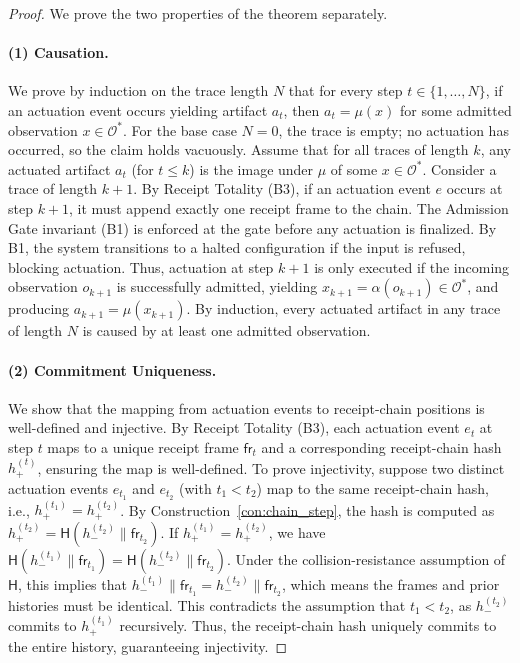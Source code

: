 \documentclass[11pt,oneside]{book}
\theoremstyle{definition}
\theoremstyle{plain}
\theoremstyle{remark}
\newcommand{\Obs}{\mathcal{O}}                 %
\newcommand{\muop}{\mu}                        %
\newcommand{\adm}{\alpha}                      %
\newcommand{\chainH}{\mathsf{H}}               %
\begin{document}
\begin{proof}
We prove the two properties of the theorem separately. %

\paragraph{(1) Causation.}
We prove by induction on the trace length $N$ that for every step $t \in \{1, \dots, N\}$, if an actuation event occurs yielding artifact $a_t$, then $a_t = \muop(x)$ for some admitted observation $x \in \Obs^*$. %
For the base case $N = 0$, the trace is empty; no actuation has occurred, so the claim holds vacuously. %
Assume that for all traces of length $k$, any actuated artifact $a_t$ (for $t \le k$) is the image under $\muop$ of some $x \in \Obs^*$. %
Consider a trace of length $k+1$. %
By Receipt Totality (B3), if an actuation event $e$ occurs at step $k+1$, it must append exactly one receipt frame to the chain. %
The Admission Gate invariant (B1) is enforced at the gate before any actuation is finalized. %
By B1, the system transitions to a halted configuration if the input is refused, blocking actuation. %
Thus, actuation at step $k+1$ is only executed if the incoming observation $o_{k+1}$ is successfully admitted, yielding $x_{k+1} = \adm(o_{k+1}) \in \Obs^*$, and producing $a_{k+1} = \muop(x_{k+1})$. %
By induction, every actuated artifact in any trace of length $N$ is caused by at least one admitted observation. %

\paragraph{(2) Commitment Uniqueness.}
We show that the mapping from actuation events to receipt-chain positions is well-defined and injective. %
By Receipt Totality (B3), each actuation event $e_t$ at step $t$ maps to a unique receipt frame $\mathsf{fr}_t$ and a corresponding receipt-chain hash $h_+^{(t)}$, ensuring the map is well-defined. %
To prove injectivity, suppose two distinct actuation events $e_{t_1}$ and $e_{t_2}$ (with $t_1 < t_2$) map to the same receipt-chain hash, i.e., $h_+^{(t_1)} = h_+^{(t_2)}$. %
By Construction~\ref{con:chain_step}, the hash is computed as $h_+^{(t_2)} = \chainH(h_-^{(t_2)} \parallel \mathsf{fr}_{t_2})$. %
If $h_+^{(t_1)} = h_+^{(t_2)}$, we have $\chainH(h_-^{(t_1)} \parallel \mathsf{fr}_{t_1}) = \chainH(h_-^{(t_2)} \parallel \mathsf{fr}_{t_2})$. %
Under the collision-resistance assumption of $\chainH$, this implies that $h_-^{(t_1)} \parallel \mathsf{fr}_{t_1} = h_-^{(t_2)} \parallel \mathsf{fr}_{t_2}$, which means the frames and prior histories must be identical. %
This contradicts the assumption that $t_1 < t_2$, as $h_-^{(t_2)}$ commits to $h_+^{(t_1)}$ recursively. %
Thus, the receipt-chain hash uniquely commits to the entire history, guaranteeing injectivity. %
\end{proof}
\end{document}
